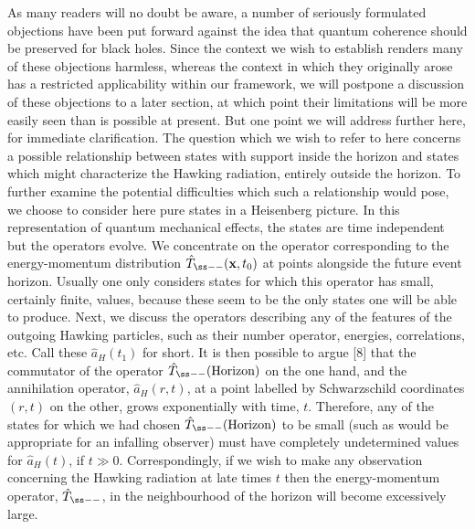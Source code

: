 As many readers will no doubt be aware, a number of seriously
formulated objections have been put forward against the idea that
quantum coherence should be preserved for black holes.  Since the
context we wish to establish renders many of these objections harmless,
whereas the context in which they originally arose has a restricted
applicability within our framework, we will postpone a discussion of
these objections to a later section, at which point their limitations
will be more easily seen than is possible at present.  But one point we
will address further here, for immediate clarification.  The question
which we wish to refer to here concerns a possible relationship between
states with support inside the horizon and states which might
characterize the Hawking radiation, entirely outside the horizon.  To
further examine the potential difficulties which such a relationship
would pose, we choose to consider here pure states in a Heisenberg
picture. In this representation of quantum mechanical effects, the
states are time independent but the operators evolve. We concentrate on
the operator corresponding to the energy-momentum distribution
$\hat{T}_{\ss --}({\bf x},t_0)$ at points alongside the future event
horizon. Usually one only considers states for which this operator has
small, certainly finite, values, because these seem to be the only
states one will be able to produce. Next, we discuss the operators
describing any of the features of the outgoing Hawking particles, such
as their number operator, energies, correlations, etc.  Call these
$\hat{a}_H(t_1)$ for short. It is then possible to argue [8] that the
commutator of the operator $\hat{T}_{\ss --}({\rm Horizon})$ on the one
hand, and the annihilation operator, $\hat{a}_H(r,t)$, at a point
labelled by Schwarzschild coordinates $(r,t)$ on the other, grows
exponentially with time, $t$. Therefore, any of the states for which we
had chosen $\hat{T}_{\ss --}({\rm Horizon})$ to be small (such as would
be appropriate for an infalling observer) must have completely
undetermined values for $\hat{a}_H(t)$, if $t\gg 0.$  Correspondingly,
if we wish to make any observation concerning the Hawking radiation at
late times $t$ then the energy-momentum operator, $\hat{T}_{\ss --}$,
in the neighbourhood of the horizon will become excessively large.

